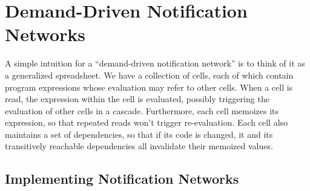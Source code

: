 \section{Demand-Driven Notification Networks}

A simple intuition for a ``demand-driven notification network'' is to
think of it as a generalized spreadsheet. We have a collection of
cells, each of which contain program expressions whose evaluation may
refer to other cells. When a cell is read, the expression within the
cell is evaluated, possibly triggering the evaluation of other cells
in a cascade. Furthermore, each cell memoizes its expression, so that
repeated reads won't trigger re-evaluation. Each cell also maintains a
set of dependencies, so that if its code is changed, it and its
transitively reachable dependencies all invalidate their memoized
values.

\subsection{Implementing Notification Networks}

